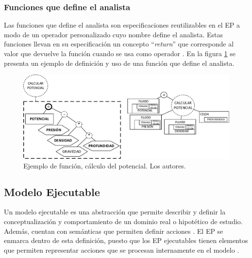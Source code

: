 \subsubsection{Funciones que define el analista}
Las funciones que define el analista son especificaciones reutilizables en el EP a modo de un operador personalizado cuyo nombre define el analista. Estas funciones llevan en su especificación un concepto ``\textit{return}'' que corresponde al valor que devuelve la función cuando se usa como operador \citep{JCalle}. En la figura \ref{fig:Potencial} se presenta un ejemplo de definición y uso de una función que define el analista.

\begin{figure}[h]
	\centering%
	\includegraphics[scale=0.8]{Fig/EjFuncion.pdf}%
	\caption[Ejemplo de función, cálculo del potencial.]{Ejemplo de función, cálculo del potencial. Los autores.} \label{fig:Potencial}
\end{figure}

\subsection{Modelo Ejecutable}
Un modelo ejecutable es una abstracción que permite describir y definir la conceptualización y comportamiento de un dominio real o hipotético de estudio. Además, cuentan con semánticas que permiten definir acciones \citep{ExecutableUML}. El EP se enmarca dentro de esta definición, puesto que los EP ejecutables tienen elementos que permiten representar acciones que se procesan internamente en el modelo \citep{JChaverra}. 
